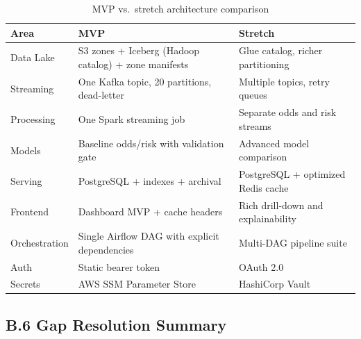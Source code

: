 \documentclass[11pt,a4paper]{article}
\begin{document}
\begin{table}[H]
\centering
\begin{tabularx}{\linewidth}{L{4cm}L{5cm}X}
\toprule
\textbf{Area} & \textbf{MVP} & \textbf{Stretch} \\
\midrule
Data Lake & S3 zones + Iceberg (Hadoop catalog) + zone manifests & Glue catalog, richer partitioning \\
Streaming & One Kafka topic, 20 partitions, dead-letter & Multiple topics, retry queues \\
Processing & One Spark streaming job & Separate odds and risk streams \\
Models & Baseline odds/risk with validation gate & Advanced model comparison \\
Serving & PostgreSQL + indexes + archival & PostgreSQL + optimized Redis cache \\
Frontend & Dashboard MVP + cache headers & Rich drill-down and explainability \\
Orchestration & Single Airflow DAG with explicit dependencies & Multi-DAG pipeline suite \\
Auth & Static bearer token & OAuth 2.0 \\
Secrets & AWS SSM Parameter Store & HashiCorp Vault \\
\bottomrule
\end{tabularx}
\caption{MVP vs.\ stretch architecture comparison}
\end{table}

\subsection*{B.6 Gap Resolution Summary}
\end{document}
